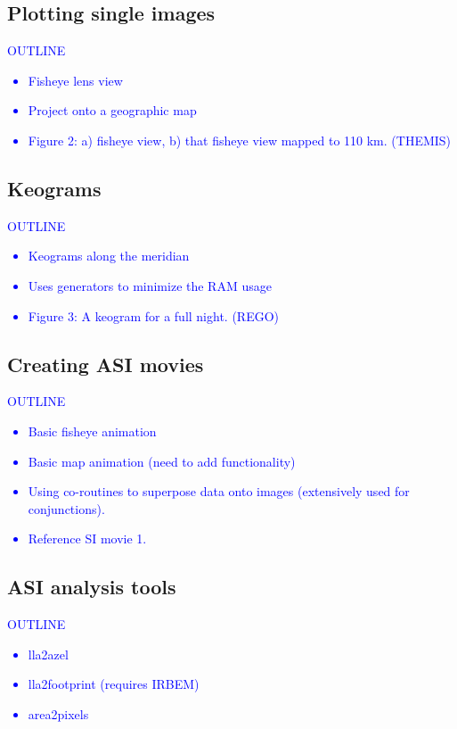 \documentclass[draft]{agujournal2019}
\begin{document}
\subsection{Plotting single images}
\textcolor{blue}{
      OUTLINE
      \begin{itemize}
            \item Fisheye lens view
            \item Project onto a geographic map
            \item Figure 2: a) fisheye view, b) that fisheye view mapped to 110 km. (THEMIS)
      \end{itemize}
}

\subsection{Keograms}
\textcolor{blue}{
      OUTLINE
      \begin{itemize}
            \item Keograms along the meridian
            \item Uses generators to minimize the RAM usage
            \item Figure 3: A keogram for a full night. (REGO)
      \end{itemize}
}

\subsection{Creating ASI movies}
\textcolor{blue}{
      OUTLINE
      \begin{itemize}
            \item Basic fisheye animation
            \item Basic map animation (need to add functionality)
            \item Using co-routines to superpose data onto images (extensively used for conjunctions).
            \item Reference SI movie 1.
      \end{itemize}
}

\subsection{ASI analysis tools}
\textcolor{blue}{
      OUTLINE
      \begin{itemize}
            \item lla2azel
            \item lla2footprint (requires IRBEM)
            \item area2pixels
      \end{itemize}
}
\end{document}
